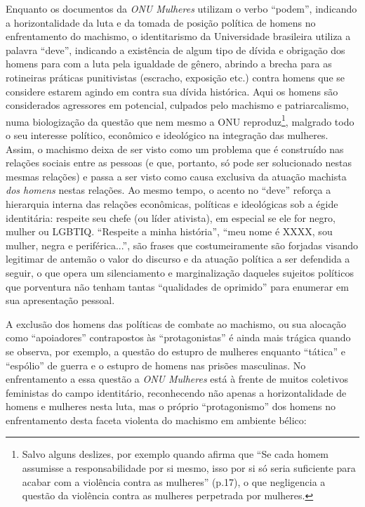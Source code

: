 Enquanto os documentos da \emph{ONU Mulheres} utilizam o verbo
``podem'', indicando a horizontalidade da luta e da tomada de posição
política de homens no enfrentamento do machismo, o identitarismo da
Universidade brasileira utiliza a palavra ``deve'', indicando a
existência de algum tipo de dívida e obrigação dos homens para com a
luta pela igualdade de gênero, abrindo a brecha para as rotineiras
práticas punitivistas (escracho, exposição etc.) contra homens que se
considere estarem agindo em contra sua dívida histórica. Aqui os homens
são considerados agressores em potencial, culpados pelo machismo e
patriarcalismo, numa biologização da questão que nem mesmo a ONU
reproduz\footnote{Salvo alguns deslizes, por exemplo quando afirma que
  ``Se cada homem assumisse a responsabilidade por si mesmo, isso por si
  só seria suficiente para acabar com a violência contra as mulheres''
  (p.17), o que negligencia a questão da violência contra as mulheres
  perpetrada por mulheres.}, malgrado todo o seu interesse político,
econômico e ideológico na integração das mulheres. Assim, o machismo
deixa de ser visto como um problema que é construído nas relações
sociais entre as pessoas (e que, portanto, só pode ser solucionado
nestas mesmas relações) e passa a ser visto como causa exclusiva da
atuação machista \emph{dos homens} nestas relações. Ao mesmo tempo, o
acento no ``deve'' reforça a hierarquia interna das relações econômicas,
políticas e ideológicas sob a égide identitária: respeite seu chefe (ou
líder ativista), em especial se ele for negro, mulher ou LGBTIQ.
``Respeite a minha história'', ``meu nome é XXXX, sou mulher, negra e
periférica...'', são frases que costumeiramente são forjadas visando
legitimar de antemão o valor do discurso e da atuação política a ser
defendida a seguir, o que opera um silenciamento e marginalização
daqueles sujeitos políticos que porventura não tenham tantas
``qualidades de oprimido'' para enumerar em sua apresentação pessoal.

A exclusão dos homens das políticas de combate ao machismo, ou sua
alocação como ``apoiadores'' contrapostos às ``protagonistas'' é ainda
mais trágica quando se observa, por exemplo, a questão do estupro de
mulheres enquanto ``tática'' e ``espólio'' de guerra e o estupro de
homens nas prisões masculinas. No enfrentamento a essa questão a
\emph{ONU Mulheres} está à frente de muitos coletivos feministas do
campo identitário, reconhecendo não apenas a horizontalidade de homens e
mulheres nesta luta, mas o próprio ``protagonismo'' dos homens no
enfrentamento desta faceta violenta do machismo em ambiente bélico:

